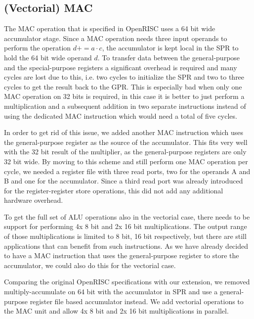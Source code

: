 \subsection{(Vectorial) MAC}
The \gls{MAC} operation that is specified in OpenRISC \cite{OR1KSPEC} uses a 64
bit wide accumulator stage. Since a \gls{MAC} operation needs three input
operands to perform the operation $d \mathrel{{+}{=}} a \cdot c$, the
accumulator is kept local in the \gls{SPR} to hold the 64 bit wide operand $d$.
To transfer data between the general-purpose and the special-purpose registers a
significant overhead is required and many cycles are lost due to this, i.e. two
cycles to initialize the \gls{SPR} and two to three cycles to get the result
back to the \gls{GPR}. This is especially bad when only one \gls{MAC} operation
on 32 bits is required, in this case it is better to just perform a
multiplication and a subsequent addition in two separate instructions instead of
using the dedicated \gls{MAC} instruction which would need a total of five
cycles.

In order to get rid of this issue, we added another \gls{MAC} instruction which
uses the general-purpose register as the source of the accumulator. This fits
very well with the 32 bit result of the multiplier, as the general-purpose
registers are only 32 bit wide.
By moving to this scheme and still perform one \gls{MAC} operation per cycle, we
needed a register file with three read ports, two for the operands A and B and
one for the accumulator. Since a third read port was already introduced for the
register-register store operations, this did not add any additional hardware
overhead.

To get the full set of \gls{ALU} operations also in the vectorial case, there
needs to be support for performing 4x 8 bit and 2x 16 bit multiplications. The
output range of those multiplications is limited to 8 bit, 16 bit respectively,
but there are still applications that can benefit from such instructions.
As we have already decided to have a \gls{MAC} instruction that uses the
general-purpose register to store the accumulator, we could also do this for the
vectorial case.


Comparing the original OpenRISC specifications with our extension, we removed
multiply-accumulate on 64 bit with the accumulator in \gls{SPR} and use a
general-purpose register file based accumulator instead. We add vectorial
operations to the \gls{MAC} unit and allow 4x 8 bit and 2x 16 bit
multiplications in parallel.


